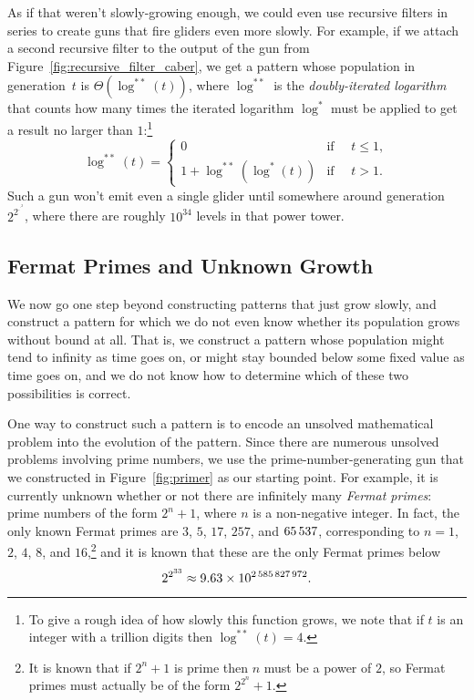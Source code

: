 As if that weren't slowly-growing enough, we could even use recursive filters in series to create guns that fire gliders even more slowly. For example, if we attach a second recursive filter to the output of the gun from Figure~\ref{fig:recursive_filter_caber}, we get a pattern whose population in generation~$t$ is $\Theta(\log^{**}(t))$, where $\log^{**}$ is the \emph{doubly-iterated logarithm} that counts how many times the iterated logarithm $\log^*$ must be applied to get a result no larger than $1$:\footnote{To give a rough idea of how slowly this function grows, we note that if $t$ is an integer with a trillion digits then $\log^{**}(t) = 4$.}
\[
	\log^{**}(t) = \begin{cases}
		0                  & \mbox{if } \quad t \leq 1, \\
		1 + \log^{**}(\log^{*}(t)) & \mbox{if } \quad t > 1.
	\end{cases}
\]
Such a gun won't emit even a single glider until somewhere around generation~$2^{2^{\cdot^{\cdot^{2}}}}$, where there are roughly $10^{34}$ levels in that power tower.


\subsection{Fermat Primes and Unknown Growth}\label{sec:unknown_growth}

We now go one step beyond constructing patterns that just grow slowly, and construct a pattern for which we do not even know whether its population grows without bound at all. That is, we construct a pattern whose population might tend to infinity as time goes on, or might stay bounded below some fixed value as time goes on, and we do not know how to determine which of these two possibilities is correct.

One way to construct such a pattern is to encode an unsolved mathematical problem into the evolution of the pattern. Since there are numerous unsolved problems involving prime numbers, we use the prime-number-generating gun that we constructed in Figure~\ref{fig:primer} as our starting point. For example, it is currently unknown whether or not there are infinitely many \emph{Fermat primes}: prime numbers of the form $2^n + 1$, where $n$ is a non-negative integer. In fact, the only known Fermat primes are $3$, $5$, $17$, $257$, and $65{\,}537$, corresponding to $n = 1$, $2$, $4$, $8$, and $16$,\footnote{It is known that if $2^n+1$ is prime then $n$ must be a power of $2$, so Fermat primes must actually be of the form $2^{2^n}+1$.} and it is known that these are the only Fermat primes below
\[
	2^{2^{33}} \approx 9.63 \times 10^{2{\,}585{\,}827{\,}972}.
\]

